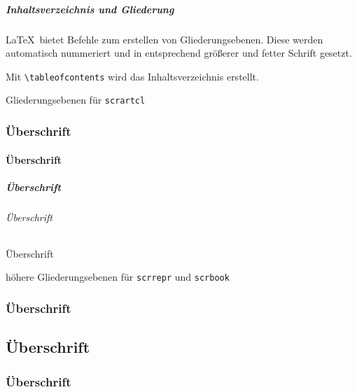 \begin{frame}[fragile]
    \frametitle{Inhaltsverzeichnis und Gliederung}
    \LaTeX \ bietet Befehle zum erstellen von Gliederungsebenen. Diese werden automatisch nummeriert und in entsprechend größerer und fetter Schrift gesetzt. 

    Mit \verb+\tableofcontents+ wird das Inhaltsverzeichnis erstellt.
    
    \begin{block}{Gliederungsebenen für \texttt{scrartcl}}
        \begin{lstverbatim}
        \section{Überschrift} 
        \subsection{Überschrift}
        \subsubsection{Überschrift}
        \paragraph{Überschrift} %
        \subparagraph{Überschrift} %
        \end{lstverbatim}
    \end{block}
    \begin{block}{höhere Gliederungsebenen für \texttt{scrrepr} und \texttt{scrbook}}
        \begin{lstverbatim}
        \part{Überschrift}
        \chapter{Überschrift}
        \section{Überschrift}
        \end{lstverbatim}
    \end{block}
\end{frame}

